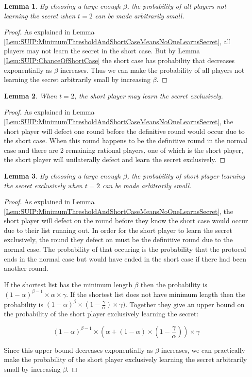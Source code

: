 \documentclass{dalcsthesis}
\newtheorem{lemma}{Lemma}
\begin{document}
\begin{lemma} By choosing a large enough $\beta$, the probability of all players not learning the secret when $t=2$ can be made arbitrarily small. \label{Lem:SUIP:NoPlayerLearningSecretIsReducible} \end{lemma} 
\begin{proof}
As explained in Lemma \ref{Lem:SUIP:MinimumThresholdAndShortCaseMeansNoOneLearnsSecret}, all players may not learn the secret in the short case. But by Lemma \ref{Lem:SUIP:ChanceOfShortCase} the short case has probability that decreases exponentially as $\beta$ increases. Thus we can make the probability of all players not learning the secret arbitrarily small by increasing $\beta$.
\end{proof}

\begin{lemma} When $t=2$, the short player may learn the secret exclusively. \label{Lem:SUIP:ShortPlayerMayLearnSecretExclusively} \end{lemma} 
\begin{proof}
As explained in Lemma \ref{Lem:SUIP:MinimumThresholdAndShortCaseMeansNoOneLearnsSecret}, the short player will defect one round before the definitive round would occur due to the short case. When this round happens to be the definitive round in the normal case and there are 2 remaining rational players, one of which is the short player, the short player will unilaterally defect and learn the secret exclusively.
\end{proof}

\begin{lemma} By choosing a large enough $\beta$, the probability of short player learning the secret exclusively when $t=2$ can be made arbitrarily small. \label{Lem:SUIP:ShortPlayerLearningSecretExclusivelyIsReducible} \end{lemma} 
\begin{proof}
As explained in Lemma \ref{Lem:SUIP:MinimumThresholdAndShortCaseMeansNoOneLearnsSecret}, the short player will defect on the round before they know the short case would occur due to their list running out. In order for the short player to learn the secret exclusively, the round they defect on must be the definitive round due to the normal case. The probability of that occuring is the probability that the protocol ends in the normal case but would have ended in the short case if there had been another round.

If the shortest list has the minimum length $\beta$ then the probability is $(1-\alpha)^{\beta-1} \times \alpha \times \gamma$. If the shortest list does not have minimum length then the probability is $(1-\alpha)^\beta \times (1 - \frac{\gamma}{\alpha}) \times \gamma)$. Together they give an upper bound on the probability of the short player exclusively learning the secret:

$$(1-\alpha)^{\beta-1} \times (\alpha + (1-\alpha) \times (1 - \frac{\gamma}{\alpha})) \times \gamma$$

Since this upper bound decreases exponentially as $\beta$ increases, we can practically make the probability of the short player exclusively learning the secret arbitrarily small by increasing $\beta$.
\end{proof}
\end{document}
